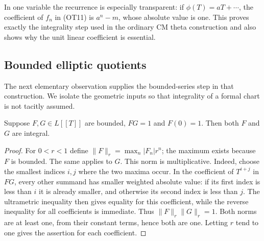 In one variable the recurrence is especially transparent: if
$\phi(T)=aT+\cdots$, the coefficient of $f_n$ in (OT11) is
$a^n-m$, whose absolute value is one.  This proves exactly the
integrality step used in the ordinary CM theta construction and
also shows why the unit linear coefficient is essential.

\subsection{Bounded elliptic quotients}

The next elementary observation supplies the bounded-series step
in that construction.  We isolate the geometric inputs so that
integrality of a formal chart is not tacitly assumed.

\begin{lemma}\label{ot-bounded-unit}
Suppose $F,G\in L[[T]]$ are bounded, $FG=1$ and $F(0)=1$.
Then both $F$ and $G$ are integral.
\end{lemma}
\begin{proof}
For $0<r<1$ define $\|F\|_r=\max_n|F_n|r^n$; the maximum
exists because $F$ is bounded.  The same applies to $G$.
This norm is multiplicative.  Indeed, choose the smallest indices
$i,j$ where the two maxima occur.  In the coefficient of
$T^{i+j}$ in $FG$, every other summand has smaller weighted
absolute value: if its first index is less than $i$ it is already
smaller, and otherwise its second index is less than $j$.
The ultrametric inequality then gives equality for this
coefficient, while the reverse inequality for all coefficients
is immediate.  Thus $\|F\|_r\|G\|_r=1$.
Both norms are at least one, from their constant terms, hence
both are one.  Letting $r$ tend to one gives the assertion for
each coefficient.
\end{proof}

